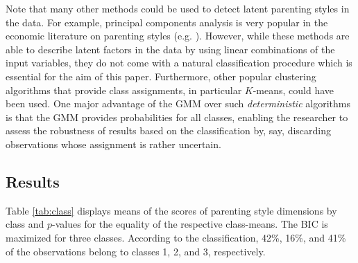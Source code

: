 Note that many other methods could be used to detect latent parenting styles in the data. For example, principal components analysis is very popular in the economic literature on parenting styles (e.g. \cite{ermischOriginsSocialImmobility2008, fioriniHowAllocationChildren2014, bonoEarlyMaternalTime2016, cobb-clarkParentingStyleInvestment2019, zumbuehlParentalInvolvementIntergenerational2020}). However, while these methods are able to describe latent factors in the data by using linear combinations of the input variables, they do not come with a natural classification procedure which is essential for the aim of this paper. Furthermore, other popular clustering algorithms that provide class assignments, in particular $K$-means, could have been used. One major advantage of the GMM over such \textit{deterministic} algorithms is that the GMM provides probabilities for all classes, enabling the researcher to assess the robustness of results based on the classification by, say, discarding observations whose assignment is rather uncertain.
%
%
\subsection{Results}
Table \ref{tab:class} displays means of the scores of parenting style dimensions by class and $p$-values for the equality of the respective class-means. The BIC is maximized for three classes. According to the classification, 42\%, 16\%, and 41\% of the observations belong to classes 1, 2, and 3, respectively.


